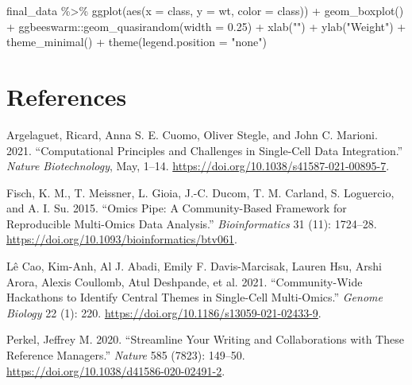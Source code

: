 \documentclass[smallextended]{svjour3}       %
\newenvironment{Shaded}{\begin{snugshade}}{\end{snugshade}}
\newcommand{\AttributeTok}[1]{\textcolor[rgb]{0.77,0.63,0.00}{#1}}
\newcommand{\FloatTok}[1]{\textcolor[rgb]{0.00,0.00,0.81}{#1}}
\newcommand{\FunctionTok}[1]{\textcolor[rgb]{0.00,0.00,0.00}{#1}}
\newcommand{\NormalTok}[1]{#1}
\newcommand{\SpecialCharTok}[1]{\textcolor[rgb]{0.00,0.00,0.00}{#1}}
\newcommand{\StringTok}[1]{\textcolor[rgb]{0.31,0.60,0.02}{#1}}
\newlength{\cslhangindent}
\newlength{\cslentryspacingunit} %
\newenvironment{CSLReferences}[2] %
 {%
  \setlength{\parindent}{0pt}
  \ifodd #1
  \let\oldpar\par
  \def\par{\hangindent=\cslhangindent\oldpar}
  \fi
  \setlength{\parskip}{#2\cslentryspacingunit}
 }%
 {}
\begin{document}
\begin{Shaded}
\begin{Highlighting}[]
\NormalTok{final\_data }\SpecialCharTok{\%\textgreater{}\%} 
  \FunctionTok{ggplot}\NormalTok{(}\FunctionTok{aes}\NormalTok{(}\AttributeTok{x =}\NormalTok{ class, }\AttributeTok{y =}\NormalTok{ wt, }\AttributeTok{color =}\NormalTok{ class)) }\SpecialCharTok{+}
  \FunctionTok{geom\_boxplot}\NormalTok{() }\SpecialCharTok{+}
\NormalTok{  ggbeeswarm}\SpecialCharTok{::}\FunctionTok{geom\_quasirandom}\NormalTok{(}\AttributeTok{width =} \FloatTok{0.25}\NormalTok{) }\SpecialCharTok{+} 
  \FunctionTok{xlab}\NormalTok{(}\StringTok{""}\NormalTok{) }\SpecialCharTok{+}
  \FunctionTok{ylab}\NormalTok{(}\StringTok{"Weight"}\NormalTok{) }\SpecialCharTok{+} 
  \FunctionTok{theme\_minimal}\NormalTok{() }\SpecialCharTok{+}
  \FunctionTok{theme}\NormalTok{(}\AttributeTok{legend.position =} \StringTok{"none"}\NormalTok{)}
\end{Highlighting}
\end{Shaded}

\hypertarget{references}{%
\section*{References}\label{references}}

\hypertarget{refs}{}
\begin{CSLReferences}{1}{0}
\leavevmode{}%
Argelaguet, Ricard, Anna S. E. Cuomo, Oliver Stegle, and John C. Marioni. 2021. {``Computational Principles and Challenges in Single-Cell Data Integration.''} \emph{Nature Biotechnology}, May, 1--14. \url{https://doi.org/10.1038/s41587-021-00895-7}.

\leavevmode{}%
Fisch, K. M., T. Meissner, L. Gioia, J.-C. Ducom, T. M. Carland, S. Loguercio, and A. I. Su. 2015. {``Omics {Pipe}: A Community-Based Framework for Reproducible Multi-Omics Data Analysis.''} \emph{Bioinformatics} 31 (11): 1724--28. \url{https://doi.org/10.1093/bioinformatics/btv061}.

\leavevmode{}%
Lê Cao, Kim-Anh, Al J. Abadi, Emily F. Davis-Marcisak, Lauren Hsu, Arshi Arora, Alexis Coullomb, Atul Deshpande, et al. 2021. {``Community-Wide Hackathons to Identify Central Themes in Single-Cell Multi-Omics.''} \emph{Genome Biology} 22 (1): 220. \url{https://doi.org/10.1186/s13059-021-02433-9}.

\leavevmode{}%
Perkel, Jeffrey M. 2020. {``Streamline Your Writing {\textemdash} and Collaborations {\textemdash} with These Reference Managers.''} \emph{Nature} 585 (7823): 149--50. \url{https://doi.org/10.1038/d41586-020-02491-2}.

\end{CSLReferences}




\end{document}
